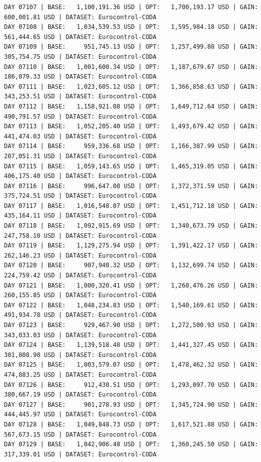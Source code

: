\documentclass[11pt,a4paper]{article}
\begin{document}
\begin{verbatim}
DAY 07107 | BASE:   1,100,191.36 USD | OPT:   1,700,193.17 USD | GAIN: 600,001.81 USD | DATASET: Eurocontrol-CODA
DAY 07108 | BASE:   1,034,539.53 USD | OPT:   1,595,984.18 USD | GAIN: 561,444.65 USD | DATASET: Eurocontrol-CODA
DAY 07109 | BASE:     951,745.13 USD | OPT:   1,257,499.88 USD | GAIN: 305,754.75 USD | DATASET: Eurocontrol-CODA
DAY 07110 | BASE:   1,001,600.34 USD | OPT:   1,187,679.67 USD | GAIN: 186,079.33 USD | DATASET: Eurocontrol-CODA
DAY 07111 | BASE:   1,023,605.12 USD | OPT:   1,366,858.63 USD | GAIN: 343,253.51 USD | DATASET: Eurocontrol-CODA
DAY 07112 | BASE:   1,158,921.08 USD | OPT:   1,649,712.64 USD | GAIN: 490,791.57 USD | DATASET: Eurocontrol-CODA
DAY 07113 | BASE:   1,052,205.40 USD | OPT:   1,493,679.42 USD | GAIN: 441,474.03 USD | DATASET: Eurocontrol-CODA
DAY 07114 | BASE:     959,336.68 USD | OPT:   1,166,387.99 USD | GAIN: 207,051.31 USD | DATASET: Eurocontrol-CODA
DAY 07115 | BASE:   1,059,143.65 USD | OPT:   1,465,319.05 USD | GAIN: 406,175.40 USD | DATASET: Eurocontrol-CODA
DAY 07116 | BASE:     996,647.08 USD | OPT:   1,372,371.59 USD | GAIN: 375,724.51 USD | DATASET: Eurocontrol-CODA
DAY 07117 | BASE:   1,016,548.07 USD | OPT:   1,451,712.18 USD | GAIN: 435,164.11 USD | DATASET: Eurocontrol-CODA
DAY 07118 | BASE:   1,092,915.69 USD | OPT:   1,340,673.79 USD | GAIN: 247,758.10 USD | DATASET: Eurocontrol-CODA
DAY 07119 | BASE:   1,129,275.94 USD | OPT:   1,391,422.17 USD | GAIN: 262,146.23 USD | DATASET: Eurocontrol-CODA
DAY 07120 | BASE:     907,940.32 USD | OPT:   1,132,699.74 USD | GAIN: 224,759.42 USD | DATASET: Eurocontrol-CODA
DAY 07121 | BASE:   1,000,320.41 USD | OPT:   1,260,476.26 USD | GAIN: 260,155.85 USD | DATASET: Eurocontrol-CODA
DAY 07122 | BASE:   1,048,234.83 USD | OPT:   1,540,169.61 USD | GAIN: 491,934.78 USD | DATASET: Eurocontrol-CODA
DAY 07123 | BASE:     929,467.90 USD | OPT:   1,272,500.93 USD | GAIN: 343,033.03 USD | DATASET: Eurocontrol-CODA
DAY 07124 | BASE:   1,139,518.48 USD | OPT:   1,441,327.45 USD | GAIN: 301,808.98 USD | DATASET: Eurocontrol-CODA
DAY 07125 | BASE:   1,003,579.07 USD | OPT:   1,478,462.32 USD | GAIN: 474,883.25 USD | DATASET: Eurocontrol-CODA
DAY 07126 | BASE:     912,430.51 USD | OPT:   1,293,097.70 USD | GAIN: 380,667.19 USD | DATASET: Eurocontrol-CODA
DAY 07127 | BASE:     901,278.93 USD | OPT:   1,345,724.90 USD | GAIN: 444,445.97 USD | DATASET: Eurocontrol-CODA
DAY 07128 | BASE:   1,049,848.73 USD | OPT:   1,617,521.88 USD | GAIN: 567,673.15 USD | DATASET: Eurocontrol-CODA
DAY 07129 | BASE:   1,042,906.48 USD | OPT:   1,360,245.50 USD | GAIN: 317,339.01 USD | DATASET: Eurocontrol-CODA

\end{verbatim}
\end{document}
